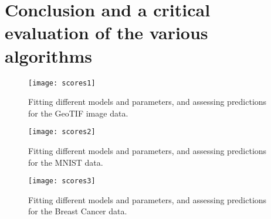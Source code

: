 \section{Conclusion and a critical evaluation of the various algorithms}
\label{chap:Conclusion and a critical evaluation of the various algorithms}

\begin{figure}[H]
\label{fig:scores1}
\texttt{[image: scores1]}
\caption{Fitting different models and parameters, and assessing predictions for the GeoTIF image data.}
\end{figure}

\begin{figure}[H]
\label{fig:scores2}
\texttt{[image: scores2]}
\caption{Fitting different models and parameters, and assessing predictions for the MNIST data.}
\end{figure}

\begin{figure}[H]
\label{fig:scores3}
\texttt{[image: scores3]}
\caption{Fitting different models and parameters, and assessing predictions for the Breast Cancer data.}
\end{figure}
